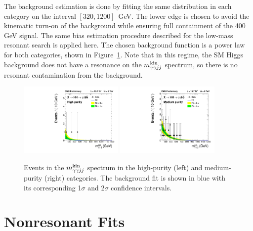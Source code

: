 The background estimation is done by fitting the same distribution in each category on the interval
$[320, 1200]$~GeV. The lower edge is chosen to avoid the kinematic turn-on of the background
while ensuring full containment of the 400 GeV signal. The same bias estimation procedure
described for the low-mass resonant search is applied here. The chosen background function is a power
law for both categories, shown in Figure~\ref{fig:datafit_4body}. Note that in this regime,
the SM Higgs background does not have a resonance on the $m_{\gamma\gamma jj}^{\rm kin}$ spectrum, so
there is no resonant contamination from the background.

\begin{figure}[htbp!]
 \begin{center}
   \includegraphics[width=0.45\textwidth]{figures/results/databkgoversig_cat0_4body.pdf}
   \includegraphics[width=0.45\textwidth]{figures/results/databkgoversig_cat1_4body.pdf}
 \end{center}
\caption{Events in the $m_{\gamma\gamma jj}^{\rm kin}$ spectrum in the high-purity (left) and medium-purity (right)
categories. The background fit is shown in blue
with its corresponding 1$\sigma$ and 2$\sigma$ confidence intervals.}
\label{fig:datafit_4body}
\end{figure}

\section{Nonresonant Fits\label{sec:nonresfits}}

